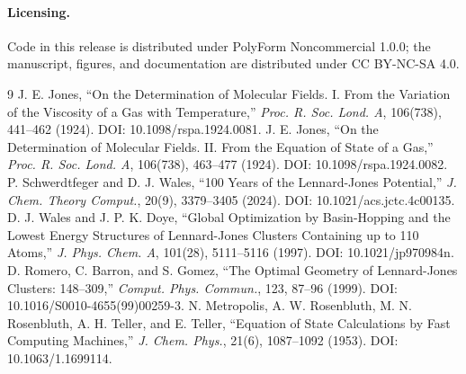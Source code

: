 \documentclass[11pt]{article}
\begin{document}
\paragraph{Licensing.} Code in this release is distributed under PolyForm Noncommercial 1.0.0; the manuscript, figures, and documentation are distributed under CC BY-NC-SA 4.0.
\begin{thebibliography}{9}
 J. E. Jones, ``On the Determination of Molecular Fields. I. From the Variation of the Viscosity of a Gas with Temperature,'' \emph{Proc. R. Soc. Lond. A}, 106(738), 441--462 (1924). DOI: 10.1098/rspa.1924.0081.
 J. E. Jones, ``On the Determination of Molecular Fields. II. From the Equation of State of a Gas,'' \emph{Proc. R. Soc. Lond. A}, 106(738), 463--477 (1924). DOI: 10.1098/rspa.1924.0082.
 P. Schwerdtfeger and D. J. Wales, ``100 Years of the Lennard-Jones Potential,'' \emph{J. Chem. Theory Comput.}, 20(9), 3379--3405 (2024). DOI: 10.1021/acs.jctc.4c00135.
 D. J. Wales and J. P. K. Doye, ``Global Optimization by Basin-Hopping and the Lowest Energy Structures of Lennard-Jones Clusters Containing up to 110 Atoms,'' \emph{J. Phys. Chem. A}, 101(28), 5111--5116 (1997). DOI: 10.1021/jp970984n.
 D. Romero, C. Barron, and S. Gomez, ``The Optimal Geometry of Lennard-Jones Clusters: 148--309,'' \emph{Comput. Phys. Commun.}, 123, 87--96 (1999). DOI: 10.1016/S0010-4655(99)00259-3.
 N. Metropolis, A. W. Rosenbluth, M. N. Rosenbluth, A. H. Teller, and E. Teller, ``Equation of State Calculations by Fast Computing Machines,'' \emph{J. Chem. Phys.}, 21(6), 1087--1092 (1953). DOI: 10.1063/1.1699114.
\end{thebibliography}
\end{document}
